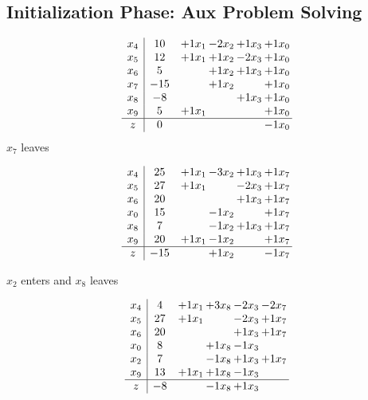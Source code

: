 \documentclass[12pt]{article}
\begin{document}
\subsection{Initialization Phase: Aux Problem Solving}
\[\begin{array}{c| c c@{\hskip 2pt} c@{\hskip 2pt} c@{\hskip 2pt} c@{\hskip 2pt} }
 x_{4}   &  10 & + 1 x_{1} & -2 x_{2} & + 1 x_{3} & + 1 x_{0}\\
 x_{5}   &  12 & + 1 x_{1} & + 1 x_{2} & -2 x_{3} & + 1 x_{0}\\
 x_{6}   &  5  &   & + 1 x_{2} & + 1 x_{3} & + 1 x_{0}\\
 x_{7}   &  -15  &   & + 1 x_{2} &   & + 1 x_{0}\\
 x_{8}   &  -8  &    &   & + 1 x_{3} & + 1 x_{0}\\
 x_{9}   &  5 & + 1 x_{1} &    &   & + 1 x_{0}\\
\hline
z    &  0  &    &    &   & -1 x_{0}\\
\end{array}\]
$ x_{7} $ leaves 

 \[\begin{array}{c| c c@{\hskip 2pt} c@{\hskip 2pt} c@{\hskip 2pt} c@{\hskip 2pt} }
 x_{4}   &  25 & + 1 x_{1} & -3 x_{2} & + 1 x_{3} & + 1 x_{7}\\
 x_{5}   &  27 & + 1 x_{1} &   & -2 x_{3} & + 1 x_{7}\\
 x_{6}   &  20  &    &   & + 1 x_{3} & + 1 x_{7}\\
 x_{0}   &  15  &   & -1 x_{2} &   & + 1 x_{7}\\
 x_{8}   &  7  &   & -1 x_{2} & + 1 x_{3} & + 1 x_{7}\\
 x_{9}   &  20 & + 1 x_{1} & -1 x_{2} &   & + 1 x_{7}\\
\hline
z    &  -15  &   & + 1 x_{2} &   & -1 x_{7}\\
\end{array}\]


 $ x_{2} $ enters and $ x_{8} $ leaves 

 \[\begin{array}{c| c c@{\hskip 2pt} c@{\hskip 2pt} c@{\hskip 2pt} c@{\hskip 2pt} }
 x_{4}   &  4 & + 1 x_{1} & + 3 x_{8} & -2 x_{3} & -2 x_{7}\\
 x_{5}   &  27 & + 1 x_{1} &   & -2 x_{3} & + 1 x_{7}\\
 x_{6}   &  20  &    &   & + 1 x_{3} & + 1 x_{7}\\
 x_{0}   &  8  &   & + 1 x_{8} & -1 x_{3} &   \\
 x_{2}   &  7  &   & -1 x_{8} & + 1 x_{3} & + 1 x_{7}\\
 x_{9}   &  13 & + 1 x_{1} & + 1 x_{8} & -1 x_{3} &   \\
\hline
z    &  -8  &   & -1 x_{8} & + 1 x_{3} &   \\
\end{array}\]
\end{document}
